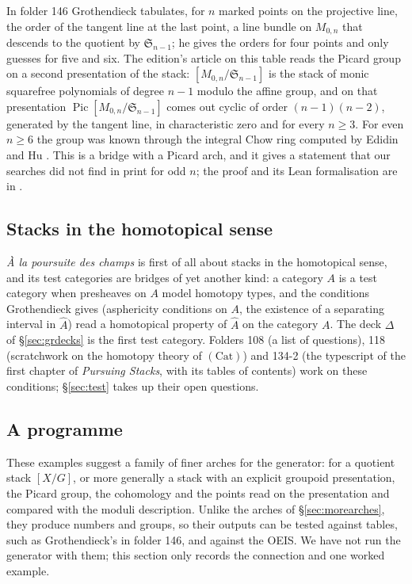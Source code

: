 In folder 146 Grothendieck tabulates, for $n$ marked points on the projective line, the order of the tangent line at the last point, a line bundle on $M_{0,n}$ that descends to the quotient by $\mathfrak S_{n-1}$; he gives the orders for four points and only guesses for five and six. The edition's article on this table \cite{hua-tangent} reads the Picard group on a second presentation of the stack: $[M_{0,n}/\mathfrak S_{n-1}]$ is the stack of monic squarefree polynomials of degree $n-1$ modulo the affine group, and on that presentation $\operatorname{Pic}[M_{0,n}/\mathfrak S_{n-1}]$ comes out cyclic of order $(n-1)(n-2)$, generated by the tangent line, in characteristic zero and for every $n\ge3$. For even $n\ge6$ the group was known through the integral Chow ring computed by Edidin and Hu \cite{edidin-hu}. This is a bridge with a Picard arch, and it gives a statement that our searches did not find in print for odd $n$; the proof and its Lean formalisation are in \cite{hua-tangent}.

\subsection{Stacks in the homotopical sense}

\emph{À la poursuite des champs} \cite{maltsiniotis} is first of all about stacks in the homotopical sense, and its test categories are bridges of yet another kind: a category $A$ is a test category when presheaves on $A$ model homotopy types, and the conditions Grothendieck gives (asphericity conditions on $A$, the existence of a separating interval in $\widehat A$) read a homotopical property of $\widehat A$ on the category $A$. The deck $\Delta$ of \S\ref{sec:grdecks} is the first test category. Folders 108 (a list of questions), 118 (scratchwork on the homotopy theory of $(\mathrm{Cat})$) and 134-2 (the typescript of the first chapter of \emph{Pursuing Stacks}, with its tables of contents) work on these conditions; \S\ref{sec:test} takes up their open questions.

\subsection{A programme}

These examples suggest a family of finer arches for the generator: for a quotient stack $[X/G]$, or more generally a stack with an explicit groupoid presentation, the Picard group, the cohomology and the points read on the presentation and compared with the moduli description. Unlike the arches of \S\ref{sec:morearches}, they produce numbers and groups, so their outputs can be tested against tables, such as Grothendieck's in folder 146, and against the OEIS. We have not run the generator with them; this section only records the connection and one worked example.
